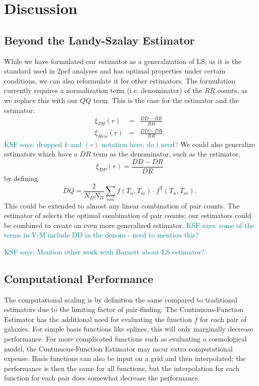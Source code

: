 \documentclass[modern]{aastex62}
\newcommand{\cf}{2pcf\xspace} %
\newcommand{\Est}{The Continuous-Function Estimator\xspace}
\newcommand{\est}{the Continuous-Function Estimator\xspace}
\newcommand{\LS}{LS\xspace}
\newcommand{\T}{^{\mathsf{T}}}
\newcommand{\KSF}[1]{\textcolor{teal}{KSF says: #1}}
\begin{document}

\section{Discussion} \label{sec:discuss}

\subsection{Beyond the Landy-Szalay Estimator}

While we have formulated our estimator as a generalization of \LS, as it is the standard used in \cf analyses and has optimal properties under certain conditions, we can also reformulate it for other estimators.
The formulation currently requires a normalization term (i.e. denominator) of the $RR$ counts, as we replace this with our $QQ$ term.
This is the case for the \cite{PeeblesHauser1974} estimator and the \cite{Hewett1982} estimator:
\begin{eqnarray}
    \xi_{PH}(r) &=& \frac{DD - RR}{RR} \\
    \xi_{Hew}(r) &=& \frac{DD - DR}{RR}.
\end{eqnarray}
\KSF{dropped $k$ and $(r)$ notation here, do i need?}
We could also generalize estimators which have a $DR$ term as the denominator, such as the \cite{DavisPeebles1983} estimator,
\begin{equation}
    \xi_{DP}(r) = \frac{DD - DR}{DR}
\end{equation}
by defining
\begin{equation}
    DQ = \frac{2}{N_D N_R} \sum_{n m} f(T_n, T_m) \cdot f\T(T_n, T_m).
\end{equation}
This could be extended to almost any linear combination of pair counts.
The estimator of \cite{VargasMagana2013} selects the optimal combination of pair counts; our estimators could be combined to create an even more generalized estimator.
\KSF{some of the terms in V-M include DD in the denom - need to mention this?}

\KSF{Mention other work with Barnett about LS estimator?}

\subsection{Computational Performance}

The computational scaling is by definition the same compared to traditional estimators due to the limiting factor of pair-finding.
\Est has the additional need for evaluating the function $f$ for each pair of galaxies.
For simple basis functions like splines, this will only marginally decrease performance.
For more complicated functions such as evaluating a cosmological model, \est may incur extra computational expense.
Basis functions can also be input on a grid and then interpolated; the performance is then the same for all functions, but the interpolation for each function for each pair does somewhat decrease the performance.
\end{document}

